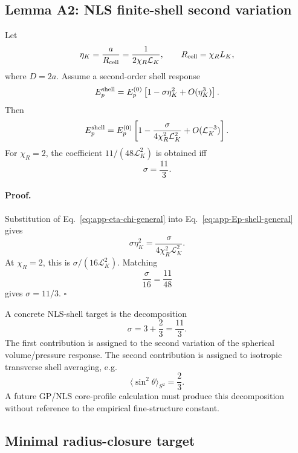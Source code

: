 \documentclass[11pt]{article}
\begin{document}
\subsection{Lemma A2: NLS finite-shell second variation}

Let
\begin{equation}
  \eta_K
  =
  \frac{a}{R_{\rm cell}}
  =
  \frac{1}{2\chi_R\mathcal L_K},
  \qquad
  R_{\rm cell}=\chi_R L_K,
  \label{eq:app-eta-chi-general}
\end{equation}
where \(D=2a\).  Assume a second-order shell response
\begin{equation}
  E_p^{\rm shell}
  =
  E_p^{(0)}
  \left[
  1-\sigma\eta_K^2+O(\eta_K^3)
  \right].
  \label{eq:app-Ep-shell-general}
\end{equation}
Then
\begin{equation}
  E_p^{\rm shell}
  =
  E_p^{(0)}
  \left[
  1-\frac{\sigma}{4\chi_R^2\mathcal L_K^2}
  +O(\mathcal L_K^{-3})
  \right].
  \label{eq:app-Ep-shell-c2}
\end{equation}
For \(\chi_R=2\), the coefficient \(11/(48\mathcal L_K^2)\) is obtained iff
\begin{equation}
  \sigma=\frac{11}{3}.
  \label{eq:app-sigma-required}
\end{equation}

\paragraph{Proof.}
Substitution of Eq.~\eqref{eq:app-eta-chi-general} into
Eq.~\eqref{eq:app-Ep-shell-general} gives
\[
  \sigma\eta_K^2
  =
  \frac{\sigma}{4\chi_R^2\mathcal L_K^2}.
\]
At \(\chi_R=2\), this is \(\sigma/(16\mathcal L_K^2)\).  Matching
\[
  \frac{\sigma}{16}
  =
  \frac{11}{48}
\]
gives \(\sigma=11/3\). \(\square\)

A concrete NLS-shell target is the decomposition
\begin{equation}
  \sigma
  =
  3+\frac{2}{3}
  =
  \frac{11}{3}.
  \label{eq:app-sigma-decomposition}
\end{equation}
The first contribution is assigned to the second variation of the spherical
volume/pressure response.  The second contribution is assigned to isotropic
transverse shell averaging, e.g.
\[
  \langle \sin^2\theta\rangle_{S^2}=\frac{2}{3}.
\]
A future GP/NLS core-profile calculation must produce this decomposition
without reference to the empirical fine-structure constant.

\subsection{Minimal radius-closure target}
\end{document}
